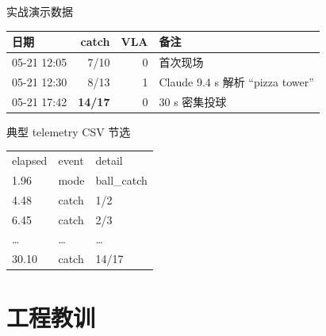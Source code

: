 \documentclass[aspectratio=169, 11pt]{beamer}
\begin{document}
\begin{frame}{实战演示数据}
\centering\small
\begin{tabular}{lrrl}
\toprule
日期 & catch & VLA & 备注 \\
\midrule
05-21 12:05 & 7/10  & 0 & 首次现场 \\
05-21 12:30 & 8/13  & 1 & Claude 9.4 s 解析 ``pizza tower'' \\
05-21 17:42 & \textbf{14/17} & 0 & 30 s 密集投球 \\
\bottomrule
\end{tabular}

\vspace{18pt}
\begin{block}{典型 telemetry CSV 节选}
\scriptsize\ttfamily
\begin{tabular}{lll}
elapsed & event & detail \\
1.96 & mode & ball\_catch \\
4.48 & catch & 1/2 \\
6.45 & catch & 2/3 \\
\dots & \dots & \dots \\
30.10 & catch & 14/17 \\
\end{tabular}
\end{block}
\end{frame}

\section{工程教训}
\end{document}
